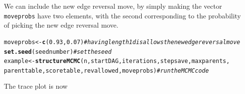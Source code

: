 \documentclass[a4paper]{article}\usepackage[]{graphicx}\usepackage[]{color}
\makeatletter
\newcommand{\hlnum}[1]{\textcolor[rgb]{0.686,0.059,0.569}{#1}}%
\newcommand{\hlcom}[1]{\textcolor[rgb]{0.678,0.584,0.686}{\textit{#1}}}%
\newcommand{\hlstd}[1]{\textcolor[rgb]{0.345,0.345,0.345}{#1}}%
\newcommand{\hlkwb}[1]{\textcolor[rgb]{0.69,0.353,0.396}{#1}}%
\newcommand{\hlkwd}[1]{\textcolor[rgb]{0.737,0.353,0.396}{\textbf{#1}}}%
\newenvironment{kframe}{%
 \def\at@end@of@kframe{}%
 \ifinner\ifhmode%
  \def\at@end@of@kframe{\end{minipage}}%
  \begin{minipage}{\columnwidth}%
 \fi\fi%
 \def\FrameCommand##1{\hskip\@totalleftmargin \hskip-\fboxsep
 \colorbox{shadecolor}{##1}\hskip-\fboxsep
     \hskip-\linewidth \hskip-\@totalleftmargin \hskip\columnwidth}%
 \MakeFramed {\advance\hsize-\width
   \@totalleftmargin\z@ \linewidth\hsize
   \@setminipage}}%
 {\par\unskip\endMakeFramed%
 \at@end@of@kframe}
\newenvironment{knitrout}{}{} %
\newcommand{\nn}{\noindent}
\makeatother
\begin{document}
We can include the new edge reversal move, by simply making the vector \texttt{moveprobs} have two elements, with the second corresponding to the probability of picking the new edge reversal move.

\begin{knitrout}
\color{fgcolor}\begin{kframe}
\begin{alltt}
\hlstd{moveprobs} \hlkwb{<-} \hlkwd{c}\hlstd{(}\hlnum{0.93}\hlstd{,} \hlnum{0.07}\hlstd{)}  \hlcom{# having length 1 disallows the new edge reversal move}
\hlkwd{set.seed}\hlstd{(seednumber)}  \hlcom{# set the seed}
\hlstd{example} \hlkwb{<-} \hlkwd{structureMCMC}\hlstd{(n, startDAG, iterations, stepsave, maxparents,}
    \hlstd{parenttable, scoretable, revallowed, moveprobs)}  \hlcom{# run the MCMC code}
\end{alltt}
\end{kframe}
\end{knitrout}

\nn The trace plot is now
\end{document}
